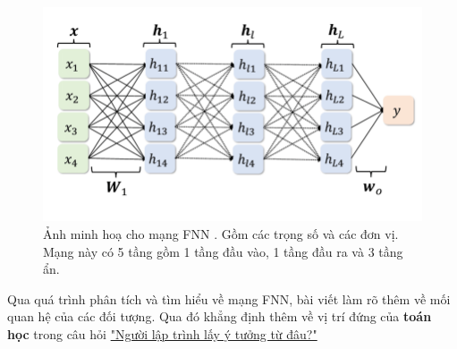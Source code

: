 	\begin{figure}[h]
		\centering
		\includegraphics[scale=0.3]{figures/fnn.illustration.png}
		\caption{Ảnh minh hoạ cho mạng FNN \cite{fnn_figure}. Gồm các trọng số và các đơn vị. Mạng này có 5 tầng gồm 1 tầng đầu vào, 1 tầng đầu ra và 3 tầng ẩn.}
		\label{fig:fnn_illustration}
	\end{figure}
	
\noindent
Qua quá trình phân tích và tìm hiểu về mạng FNN, bài viết làm rõ thêm về mối quan hệ của các đối tượng. Qua đó khẳng định thêm về vị trí đứng của \textbf{toán học} trong câu hỏi \hyperlink{main_question}{"Người lập trình lấy ý tưởng từ đâu?"}
